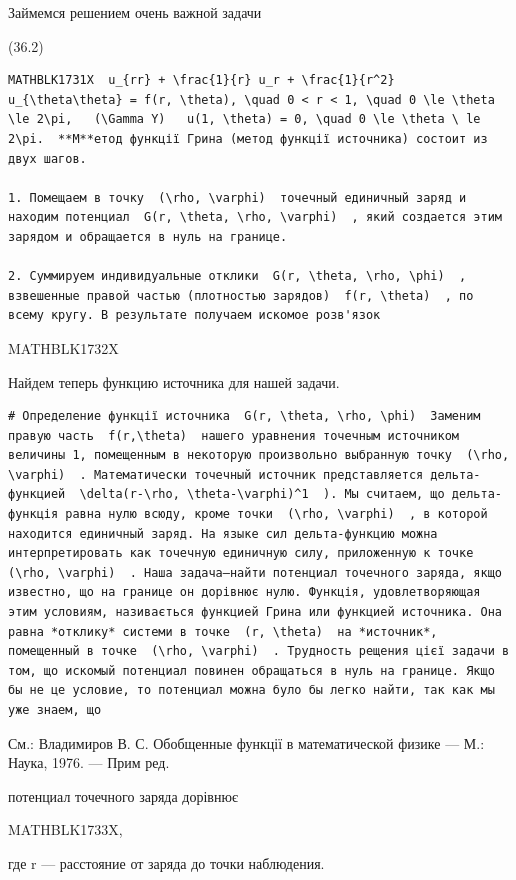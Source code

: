 \documentclass[
  ukrainian,
]{article}
\begin{document}
Займемся решением очень важной задачи

(36.2)

\begin{verbatim}
MATHBLK1731X  u_{rr} + \frac{1}{r} u_r + \frac{1}{r^2} u_{\theta\theta} = f(r, \theta), \quad 0 < r < 1, \quad 0 \le \theta \le 2\pi,   (\Gamma Y)   u(1, \theta) = 0, \quad 0 \le \theta \ le 2\pi.  **М**етод функції Грина (метод функції источника) состоит из двух шагов.

1. Помещаем в точку  (\rho, \varphi)  точечный единичный заряд и находим потенциал  G(r, \theta, \rho, \varphi)  , який создается этим зарядом и обращается в нуль на границе.

2. Суммируем индивидуальные отклики  G(r, \theta, \rho, \phi)  , взвешенные правой частью (плотностью зарядов)  f(r, \theta)  , по всему кругу. В результате получаем искомое розв'язок
\end{verbatim}

MATHBLK1732X

Найдем теперь функцию источника для нашей задачи.

\begin{verbatim}
# Определение функції источника  G(r, \theta, \rho, \phi)  Заменим правую часть  f(r,\theta)  нашего уравнения точечным источником величины 1, помещенным в некоторую произвольно выбранную точку  (\rho, \varphi)  . Математически точечный источник представляется дельта-функцией  \delta(r-\rho, \theta-\varphi)^1  ). Мы считаем, що дельта-функція равна нулю всюду, кроме точки  (\rho, \varphi)  , в которой находится единичный заряд. На языке сил дельта-функцию можна интерпретировать как точечную единичную силу, приложенную к точке  (\rho, \varphi)  . Наша задача—найти потенциал точечного заряда, якщо известно, що на границе он дорівнює нулю. Функція, удовлетворяющая этим условиям, називається функцией Грина или функцией источника. Она равна *отклику* системи в точке  (r, \theta)  на *источник*, помещенный в точке  (\rho, \varphi)  . Трудность рещения цієї задачи в том, що искомый потенциал повинен обращаться в нуль на границе. Якщо бы не це условие, то потенциал можна було бы легко найти, так как мы уже знаем, що
\end{verbatim}

См.: Владимиров В. С. Обобщенные функції в математической физике --- М.:
Наука, 1976. --- Прим ред.

потенциал точечного заряда дорівнює

MATHBLK1733X,

где r --- расстояние от заряда до точки наблюдения.
\end{document}
